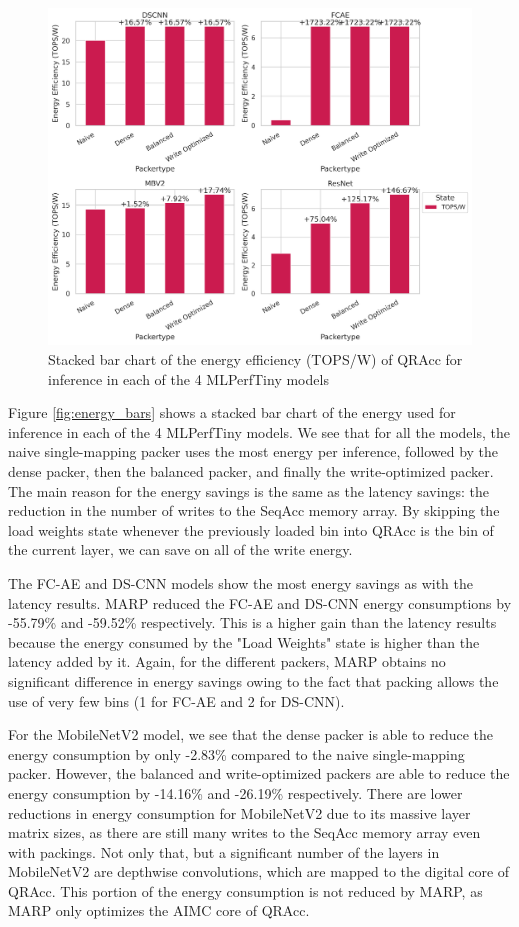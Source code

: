 \begin{figure}[htbp]
    \centering
    \includegraphics[width=\textwidth]{images/marp_qracc/tops_bars.png}
    \caption{Stacked bar chart of the energy efficiency (TOPS/W) of QRAcc for inference in each of the 4 MLPerfTiny models}
    \label{fig:tops_bars}
\end{figure}

Figure \ref{fig:energy_bars} shows a stacked bar chart of the energy used for inference in each of the 4 MLPerfTiny models. We see that for all the models, the naive single-mapping packer uses the most energy per inference, followed by the dense packer, then the balanced packer, and finally the write-optimized packer. The main reason for the energy savings is the same as the latency savings: the reduction in the number of writes to the SeqAcc memory array. By skipping the load weights state whenever the previously loaded bin into QRAcc is the bin of the current layer, we can save on all of the write energy.

The FC-AE and DS-CNN models show the most energy savings as with the latency results. MARP reduced the FC-AE and DS-CNN energy consumptions by -55.79\% and -59.52\% respectively. This is a higher gain than the latency results because the energy consumed by the "Load Weights" state is higher than the latency added by it. Again, for the different packers, MARP obtains no significant difference in energy savings owing to the fact that packing allows the use of very few bins (1 for FC-AE and 2 for DS-CNN).

For the MobileNetV2 model, we see that the dense packer is able to reduce the energy consumption by only -2.83\% compared to the naive single-mapping packer. However, the balanced and write-optimized packers are able to reduce the energy consumption by -14.16\% and -26.19\% respectively. There are lower reductions in energy consumption for MobileNetV2 due to its massive layer matrix sizes, as there are still many writes to the SeqAcc memory array even with packings. Not only that, but a significant number of the layers in MobileNetV2 are depthwise convolutions, which are mapped to the digital core of QRAcc. This portion of the energy consumption is not reduced by MARP, as MARP only optimizes the AIMC core of QRAcc.

